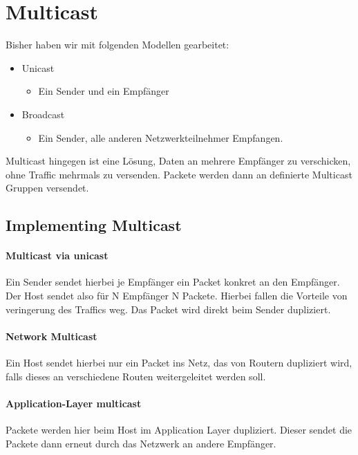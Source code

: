\section{Multicast}
    Bisher haben wir mit folgenden Modellen gearbeitet:
    \begin{itemize}
        \item Unicast
            \begin{itemize}
                \item Ein Sender und ein Empfänger
            \end{itemize}
        \item Broadcast
            \begin{itemize}
                \item Ein Sender, alle anderen Netzwerkteilnehmer Empfangen. 
            \end{itemize}
    \end{itemize}

    Multicast hingegen ist eine Lösung, Daten an mehrere Empfänger zu verschicken, ohne Traffic mehrmals zu versenden. Packete werden dann an definierte Multicast Gruppen versendet. 
    
    \subsection{Implementing Multicast}
        \paragraph{Multicast via unicast}
            Ein Sender sendet hierbei je Empfänger ein Packet konkret an den Empfänger. Der Host sendet also für N Empfänger N Packete. Hierbei fallen die Vorteile von veringerung des Traffics weg. Das Packet wird direkt beim Sender dupliziert.

        \paragraph{Network Multicast}
            Ein Host sendet hierbei nur ein Packet ins Netz, das von Routern dupliziert wird, falls dieses an verschiedene Routen weitergeleitet werden soll.

        \paragraph{Application-Layer multicast}
            Packete werden hier beim Host im Application Layer dupliziert. Dieser sendet die Packete dann erneut durch das Netzwerk an andere Empfänger. 


